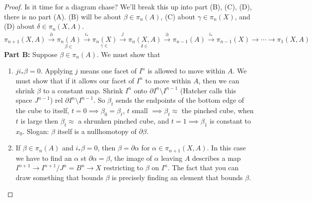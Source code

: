 \begin{proof}
    Is it time for a diagram chase? We'll break this up into part (B), (C), (D), there is no part (A). (B) will be about $\beta \in \pi_n (A)$, (C) about $\gamma \in \pi_n (X)$, and (D) about $\delta \in \pi_n (X,A)$.
\[
                \pi_{n+1}(X,A)\overset{\partial }{\longrightarrow}  \underset{\beta \in }{\pi_n (A)}  \overset{i_*}{\longrightarrow} \underset{\gamma\in }{\pi_n (X)} \overset{j}{\longrightarrow}  \underset{\delta\in }{\pi_n (X,A)}  \overset{\partial }{\longrightarrow}  \pi_{n-1}(A) \overset{i_*}{\longrightarrow} \pi_{n-1}(X)\to \cdots \to \pi_1(X,A)
            \]
    \noindent\textbf{Part B:} Suppose $\beta \in \pi_n (A)$. We must show that
    \begin{enumerate}[label=(\roman*)]
        \item $ji_*\beta =0$. Applying $j$ means one facet of $I^n $ is allowed to move within $A$. We must show that if it allows our facet of $I^n $ to move within $A$, then we can shrink $\beta $ to a constant map. Shrink $I^n $ onto $\partial I^n \setminus I^{n-1}$ (Hatcher calls this space $J^{n-1}$) rel $\partial I^n \setminus I^{n-1}$. So $\beta_t $ sends the endpoints of the bottom edge of the cube to itself, $t=0\implies \beta_0=\beta _t$, $t$ small $\implies \beta _t\approx$ the pinched cube, when $t$ is large then $\beta _t\approx$ a shrunken pinched cube, and $t=1\implies \beta_1 $ is constant to $x_0$. Slogan: $\beta $ itself is a nullhomotopy of $\partial \beta $.
        \item If $\beta \in \pi_n (A)$ and $i_*\beta =0$, then $\beta =\partial \alpha $ for $\alpha \in \pi_{n+1}(X,A)$. In this case we have to find an $\alpha $ st $\partial \alpha =\beta $, the image of $\alpha $ leaving $A$ describes a map $I^{n+1}\to  I^{n+1}/J^n =B^n \to X$ restricting to $\beta $ on $I^n $. The fact that you can draw something that bounds $\beta $ is precisely finding an element that bounds $\beta $.
    \end{enumerate}
\end{proof}
